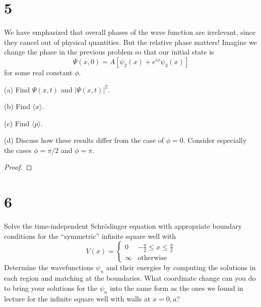 \documentclass{article}
\begin{document}
\newpage

\section*{5}
\begin{ques}\label{q5}
We have emphasized that overall phases of the wave function are irrelevant, since they
cancel out of physical quantities. But the relative phase matters! Imagine we change the
phase in the previous problem so that our initial state is
\[
\Psi(x, 0) = A[\psi_2(x) + e^{i\phi}\psi_3(x)]
\]
for some real constant $\phi$.

(a) Find $\Psi(x, t)$ and $|\Psi(x, t)|^2$.

(b) Find $\langle x \rangle$.

(c) Find $\langle p \rangle$.

(d) Discuss how these results differ from the case of $\phi = 0$. Consider especially the cases
$\phi = \pi/2$ and $\phi = \pi$.
\end{ques}

\begin{proof}
\end{proof}

\newpage

\section*{6}
\begin{ques}\label{q6}
Solve the time-independent Schrödinger equation with appropriate boundary conditions
for the “symmetric” infinite square well with
\[
V(x) =
\begin{cases}
0 & -\frac{a}{2} \le x \le \frac{a}{2} \\
\infty & \text{otherwise}
\end{cases}
\]
Determine the wavefunctions $\psi_n$ and their energies by computing the solutions in each
region and matching at the boundaries. What coordinate change can you do to bring your
solutions for the $\psi_n$ into the same form as the ones we found in lecture for the infinite
square well with walls at $x = 0, a$?
\end{ques}
\end{document}
